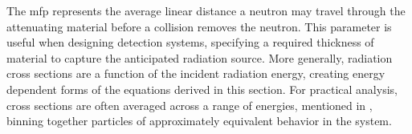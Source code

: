 \documentclass[../../../../main.tex]{subfiles}
\begin{document}
    The \gls{mfp} represents the average linear distance a neutron may travel through the attenuating material before a collision removes the neutron.
    This parameter is useful when designing detection systems, specifying a required thickness of material to capture the anticipated radiation source.
    More generally, radiation cross sections are a function of the incident radiation energy, creating energy dependent forms of the equations derived in this section.
    For practical analysis, cross sections are often averaged across a range of energies, mentioned in , binning together particles of approximately equivalent behavior in the system.
\end{document}
